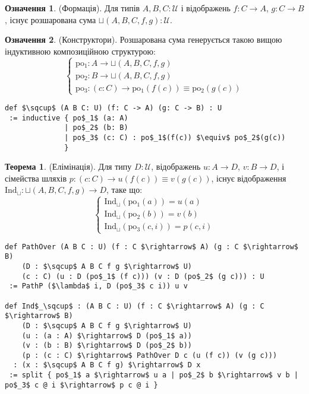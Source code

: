 \documentclass{article}
\theoremstyle{definition}
\newtheorem{theorem}{Теорема}
\newtheorem{definition}{Означення}
\begin{document}
\begin{definition} (Формація).
Для типів \( A, B, C : \mathcal{U} \) і відображень \( f : C \to A \), \( g : C \to B \),
існує розшарована сума \( \sqcup(A,B,C,f,g) : \mathcal{U} \).
\end{definition}

\begin{definition} (Конструктори).
Розшарована сума генерується такою вищою індуктивною композиційною структурою:
\[
\begin{cases}
\text{po$_1$} : A \to \sqcup(A,B,C,f,g) \\
\text{po$_2$} : B \to \sqcup(A,B,C,f,g) \\
\text{po$_3$} : (c : C) \to \text{po$_1$}(f(c)) \equiv \text{po$_2$}(g(c))
\end{cases}
\]
\begin{lstlisting}[mathescape=true]
def $\sqcup$ (A B C: U) (f: C -> A) (g: C -> B) : U
 := inductive { po$_1$ (a: A)
              | po$_2$ (b: B)
              | po$_3$ (c: C) : po$_1$(f(c)) $\equiv$ po$_2$(g(c))
              }
\end{lstlisting}
\end{definition}

\begin{theorem} (Елімінація).
Для типу \( D : \mathcal{U} \), відображень \( u : A \to D \), \( v : B \to D \),
і сімейства шляхів \( p : (c : C) \to u(f(c)) \equiv v(g(c)) \),
існує відображення \( \text{Ind}_\sqcup : \sqcup(A,B,C,f,g) \to D \), таке що:
\[
\begin{cases}
\text{Ind}_\sqcup(\text{po$_1$}(a)) = u(a) \\
\text{Ind}_\sqcup(\text{po$_2$}(b)) = v(b) \\
\text{Ind}_\sqcup(\text{po$_3$}(c,i)) = p(c,i)
\end{cases}
\]
\begin{lstlisting}[mathescape=true]
def PathOver (A B C : U) (f : C $\rightarrow$ A) (g : C $\rightarrow$ B)
    (D : $\sqcup$ A B C f g $\rightarrow$ U)
    (c : C) (u : D (po$_1$ (f c))) (v : D (po$_2$ (g c))) : U
 := PathP ($\lambda$ i, D (po$_3$ c i)) u v

def Ind$_\sqcup$ : (A B C : U) (f : C $\rightarrow$ A) (g : C $\rightarrow$ B)
    (D : $\sqcup$ A B C f g $\rightarrow$ U)
    (u : (a : A) $\rightarrow$ D (po$_1$ a))
    (v : (b : B) $\rightarrow$ D (po$_2$ b))
    (p : (c : C) $\rightarrow$ PathOver D c (u (f c)) (v (g c)))
  : (x : $\sqcup$ A B C f g) $\rightarrow$ D x
 := split { po$_1$ a $\rightarrow$ u a | po$_2$ b $\rightarrow$ v b | po$_3$ c @ i $\rightarrow$ p c @ i }
\end{lstlisting}
\end{theorem}
\end{document}
